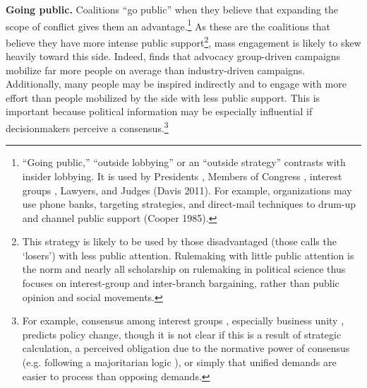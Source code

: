\textbf{Going public.} Coalitions ``go public'' when they believe that expanding the scope of conflict gives them an advantage.\footnote{
``Going public,'' ``outside lobbying'' or an ``outside strategy'' contrasts with insider lobbying. It is used by Presidents \citep{Kernell2007}, Members of Congress \citep{Malecha2012}, interest groups \citep{Walker1991, Dur2013}, Lawyers, and Judges (Davis 2011). 
For example, organizations may use phone banks, targeting strategies, and direct-mail techniques to drum-up and channel public support (Cooper 1985).
}
As these are the coalitions that believe they have more intense public support\footnote{
This strategy is likely to be used by those disadvantaged (those \citet{Schattschneider1975} calls the `losers') with less public attention.
Rulemaking with little public attention is the norm and nearly all scholarship on rulemaking in political science thus focuses on interest-group and inter-branch bargaining, rather than public opinion and social movements.
}, mass engagement is likely to skew heavily toward this side. Indeed, \citet{Potter2017} finds that advocacy group-driven campaigns mobilize far more people on average than industry-driven campaigns. Additionally, many people may be inspired indirectly and to engage with more effort than people mobilized by the side with less public support.  This is important because political information may be especially influential if decisionmakers perceive a consensus.\footnote{
For example, consensus among interest groups \citep{Golden1998, Yackee2006JPART}, especially business unity \citep{Yackee2006JOP, Haeder2015}, predicts policy change, though it is not clear if this is a result of strategic calculation, a perceived obligation due to the normative power of consensus (e.g. following a majoritarian logic \citep{Mendelson2011}), or simply that unified demands are easier to process than opposing demands.
}

